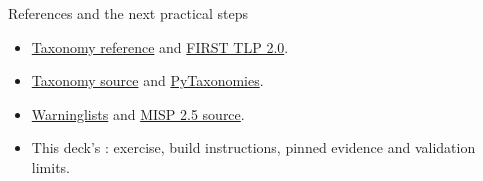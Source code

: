 \begin{frame}{References and the next practical steps}
    \begin{itemize}
        \item \href{https://www.misp-project.org/taxonomies.html}{Taxonomy reference}
        and \href{https://www.first.org/tlp/}{FIRST TLP 2.0}.
        \item \href{https://github.com/MISP/misp-taxonomies}{Taxonomy source}
        and \href{https://github.com/MISP/PyTaxonomies}{PyTaxonomies}.
        \item \href{https://github.com/MISP/misp-warninglists}{Warninglists}
        and \href{https://github.com/MISP/MISP/tree/2.5}{MISP 2.5 source}.
        \item This deck's : exercise, build instructions,
        pinned evidence and validation limits.
    \end{itemize}
\end{frame}

